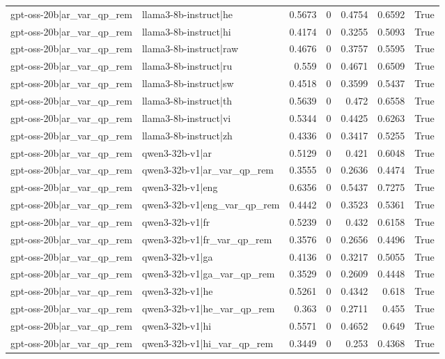 \begin{table}
\begin{tabular}{l l r r r r l}
gpt-oss-20b|ar_var_qp_rem & llama3-8b-instruct|he & 0.5673 & 0 & 0.4754 & 0.6592 & True \\
gpt-oss-20b|ar_var_qp_rem & llama3-8b-instruct|hi & 0.4174 & 0 & 0.3255 & 0.5093 & True \\
gpt-oss-20b|ar_var_qp_rem & llama3-8b-instruct|raw & 0.4676 & 0 & 0.3757 & 0.5595 & True \\
gpt-oss-20b|ar_var_qp_rem & llama3-8b-instruct|ru & 0.559 & 0 & 0.4671 & 0.6509 & True \\
gpt-oss-20b|ar_var_qp_rem & llama3-8b-instruct|sw & 0.4518 & 0 & 0.3599 & 0.5437 & True \\
gpt-oss-20b|ar_var_qp_rem & llama3-8b-instruct|th & 0.5639 & 0 & 0.472 & 0.6558 & True \\
gpt-oss-20b|ar_var_qp_rem & llama3-8b-instruct|vi & 0.5344 & 0 & 0.4425 & 0.6263 & True \\
gpt-oss-20b|ar_var_qp_rem & llama3-8b-instruct|zh & 0.4336 & 0 & 0.3417 & 0.5255 & True \\
gpt-oss-20b|ar_var_qp_rem & qwen3-32b-v1|ar & 0.5129 & 0 & 0.421 & 0.6048 & True \\
gpt-oss-20b|ar_var_qp_rem & qwen3-32b-v1|ar_var_qp_rem & 0.3555 & 0 & 0.2636 & 0.4474 & True \\
gpt-oss-20b|ar_var_qp_rem & qwen3-32b-v1|eng & 0.6356 & 0 & 0.5437 & 0.7275 & True \\
gpt-oss-20b|ar_var_qp_rem & qwen3-32b-v1|eng_var_qp_rem & 0.4442 & 0 & 0.3523 & 0.5361 & True \\
gpt-oss-20b|ar_var_qp_rem & qwen3-32b-v1|fr & 0.5239 & 0 & 0.432 & 0.6158 & True \\
gpt-oss-20b|ar_var_qp_rem & qwen3-32b-v1|fr_var_qp_rem & 0.3576 & 0 & 0.2656 & 0.4496 & True \\
gpt-oss-20b|ar_var_qp_rem & qwen3-32b-v1|ga & 0.4136 & 0 & 0.3217 & 0.5055 & True \\
gpt-oss-20b|ar_var_qp_rem & qwen3-32b-v1|ga_var_qp_rem & 0.3529 & 0 & 0.2609 & 0.4448 & True \\
gpt-oss-20b|ar_var_qp_rem & qwen3-32b-v1|he & 0.5261 & 0 & 0.4342 & 0.618 & True \\
gpt-oss-20b|ar_var_qp_rem & qwen3-32b-v1|he_var_qp_rem & 0.363 & 0 & 0.2711 & 0.455 & True \\
gpt-oss-20b|ar_var_qp_rem & qwen3-32b-v1|hi & 0.5571 & 0 & 0.4652 & 0.649 & True \\
gpt-oss-20b|ar_var_qp_rem & qwen3-32b-v1|hi_var_qp_rem & 0.3449 & 0 & 0.253 & 0.4368 & True \\

\end{tabular}
\end{table}
